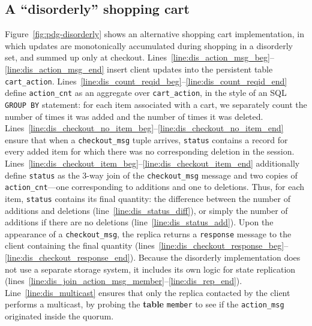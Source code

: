 \subsection{A ``disorderly'' shopping cart}

Figure~\ref{fig:pdg-disorderly} shows an alternative shopping cart
implementation, in which updates are monotonically accumulated during shopping
in a disorderly set, and summed up only at checkout.
Lines~\ref{line:dis_action_msg_beg}--\ref{line:dis_action_msg_end} insert client updates into the persistent
table \texttt{cart\_action}.  Lines~\ref{line:dis_count_reqid_beg}--\ref{line:dis_count_reqid_end} define
\texttt{action\_cnt} as an aggregate over \texttt{cart\_action}, in the style
of an SQL \texttt{GROUP BY} statement: for each item associated with a cart, we
separately count the number of times it was added and the number of times it
was deleted.
Lines~\ref{line:dis_checkout_no_item_beg}--\ref{line:dis_checkout_no_item_end}
ensure that when a \texttt{checkout\_msg} tuple arrives, \texttt{status}
contains a record for every added item for which there was no corresponding
deletion in the session.
Lines~\ref{line:dis_checkout_item_beg}--\ref{line:dis_checkout_item_end}
additionally define \texttt{status} as the 3-way join of the
\texttt{checkout\_msg} message and two copies of \texttt{action\_cnt}---one
corresponding to additions and one to deletions.  Thus, for each item,
\texttt{status} contains its final quantity: the difference between the number
of additions and deletions (line~\ref{line:dis_status_diff}), or simply the
number of additions if there are no deletions (line~\ref{line:dis_status_add}).
Upon the appearance of a \texttt{checkout\_msg}, the replica returns a
\texttt{response} message to the client containing the final quantity
(lines~\ref{line:dis_checkout_response_beg}--\ref{line:dis_checkout_response_end}).
Because the disorderly implementation does not use a separate storage system,
it includes its own logic for state replication
(lines~\ref{line:dis_join_action_msg_member}--\ref{line:dis_rep_end}).
Line~\ref{line:dis_multicast} ensures that only the replica contacted by the
client performs a multicast, by probing the \textbf{table} \texttt{member} to
see if the \texttt{action\_msg} originated inside the quorum.

